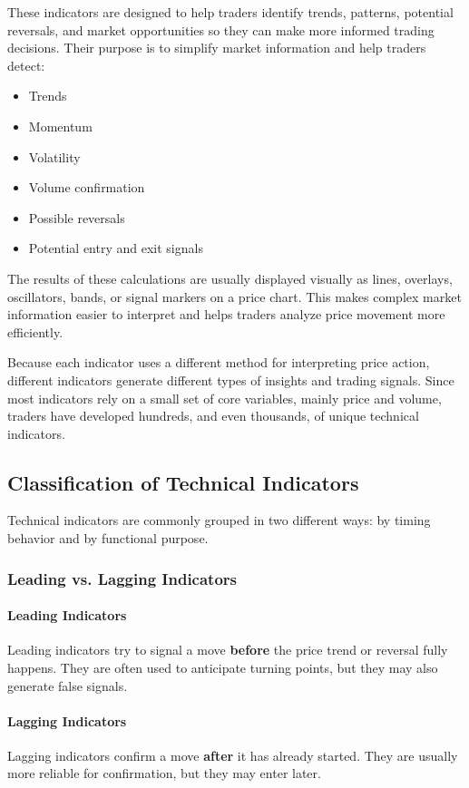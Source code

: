 \documentclass[12pt,openany]{book}
\begin{document}
These indicators are designed to help traders identify trends, patterns, potential reversals, and market opportunities so they can make more informed trading decisions. Their purpose is to simplify market information and help traders detect:

\begin{itemize}[leftmargin=*]
    \item Trends
    \item Momentum
    \item Volatility
    \item Volume confirmation
    \item Possible reversals
    \item Potential entry and exit signals
\end{itemize}

The results of these calculations are usually displayed visually as lines, overlays, oscillators, bands, or signal markers on a price chart. This makes complex market information easier to interpret and helps traders analyze price movement more efficiently.

Because each indicator uses a different method for interpreting price action, different indicators generate different types of insights and trading signals. Since most indicators rely on a small set of core variables, mainly price and volume, traders have developed hundreds, and even thousands, of unique technical indicators.

\subsection{Classification of Technical Indicators}
Technical indicators are commonly grouped in two different ways: by timing behavior and by functional purpose.

\subsubsection{Leading vs. Lagging Indicators}

\paragraph{Leading Indicators}
Leading indicators try to signal a move \textbf{before} the price trend or reversal fully happens. They are often used to anticipate turning points, but they may also generate false signals.

\paragraph{Lagging Indicators}
Lagging indicators confirm a move \textbf{after} it has already started. They are usually more reliable for confirmation, but they may enter later.
\end{document}
